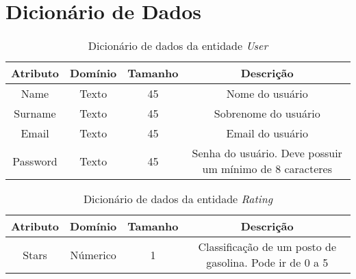 \chapter{Dicionário de Dados}
\label{chap:dicionario}

\begin{table}[]
\centering
\caption{Dicionário de dados da entidade \textit{User}}
\label{dic:user}
\begin{tabular}{cccc}
\toprule
\textbf{Atributo} & \textbf{Domínio} & \textbf{Tamanho} & \textbf{Descrição} \\
\midrule
Name                            & Texto                          & 45                             & Nome do usuário \\
Surname                         & Texto                          & 45                             & Sobrenome do usuário\\
Email                           & Texto                          & 45                             & Email do usuário\\
Password                        & Texto                          & 45                             & Senha do usuário. Deve possuir um mínimo de 8 caracteres\\
\bottomrule
\end{tabular}
\end{table}

\begin{table}[]
\centering
\caption{Dicionário de dados da entidade \textit{Rating}}
\label{dic:rating}
\begin{tabular}{cccc}
\toprule
\textbf{Atributo} & \textbf{Domínio} & \textbf{Tamanho} & \textbf{Descrição} \\
\midrule
Stars                           & Númerico                       &1                               & Classificação de um posto de gasolina. Pode ir de 0 a 5\\
\bottomrule
\end{tabular}
\end{table}

